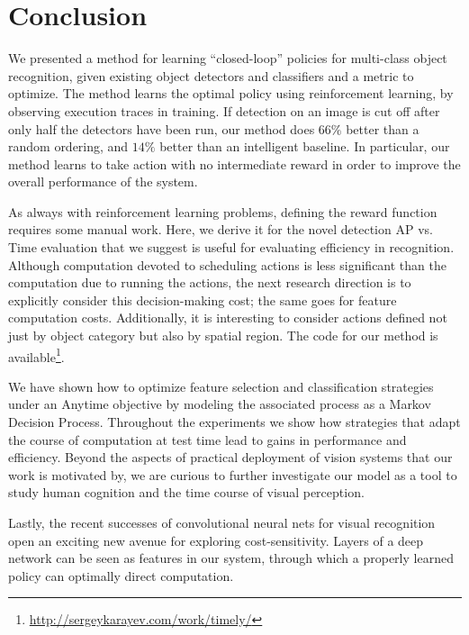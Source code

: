\chapter{Conclusion}


We presented a method for learning ``closed-loop'' policies for multi-class object recognition, given existing object detectors and classifiers and a metric to optimize.
The method learns the optimal policy using reinforcement learning, by observing execution traces in training.
If detection on an image is cut off after only half the detectors have been run, our method does $66\%$ better than a random ordering, and $14\%$ better than an intelligent baseline.
In particular, our method learns to take action with no intermediate reward in order to improve the overall performance of the system.

As always with reinforcement learning problems, defining the reward function requires some manual work.
Here, we derive it for the novel detection AP vs. Time evaluation that we suggest is useful for evaluating efficiency in recognition.
Although computation devoted to scheduling actions is less significant than the computation due to running the actions, the next research direction is to explicitly consider this decision-making cost; the same goes for feature computation costs.
Additionally, it is interesting to consider actions defined not just by object category but also by spatial region.
The code for our method is available\footnote{\url{http://sergeykarayev.com/work/timely/}}.

We have shown how to optimize feature selection and classification strategies under an Anytime objective by modeling the associated process as a Markov Decision Process.
Throughout the experiments we show how strategies that adapt the course of computation at test time lead to gains in performance and efficiency.
Beyond the aspects of practical deployment of vision systems that our work is motivated by, we are curious to further investigate our model as a tool to study human cognition and the time course of visual perception.

Lastly, the recent successes of convolutional neural nets for visual recognition open an exciting new avenue for exploring cost-sensitivity.
Layers of a deep network can be seen as features in our system, through which a properly learned policy can optimally direct computation.
